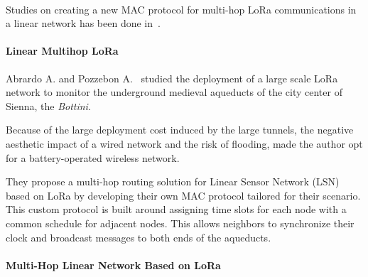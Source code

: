 


\paragraph{}

Studies on creating a new MAC protocol for multi-hop LoRa communications in a linear
network has been done in~\cite{Abrardo_2019,duong2018}.

\paragraph{Linear Multihop LoRa}

Abrardo A. and Pozzebon A.~\cite{Abrardo_2019} studied the deployment of a
large scale LoRa network to monitor the underground medieval aqueducts of the city center 
of Sienna, the \emph{Bottini}.

Because of the large deployment cost induced by the large tunnels, the negative 
aesthetic impact of a wired network and the risk of flooding, made the author
opt for a battery-operated wireless network.


They propose a multi-hop routing solution for Linear Sensor Network (LSN) based 
on LoRa by developing their own MAC protocol tailored for their scenario.
This custom protocol is built around assigning time slots for each node with
a common schedule for adjacent nodes.
This allows neighbors to synchronize their clock and broadcast messages to
both ends of the aqueducts.


\paragraph{Multi-Hop Linear Network Based on LoRa}

